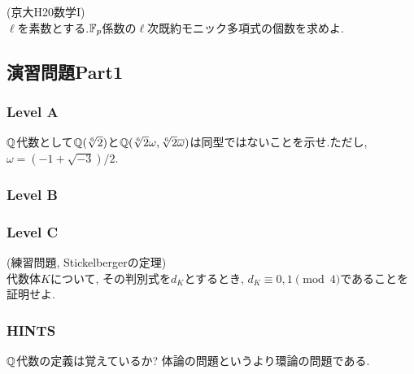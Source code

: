 \begin{egprob} (京大H20数学I)\\
$\ell$を素数とする.$\mathbb{F}_{p}$係数の$\ell$次既約モニック多項式の個数を求めよ.
\end{egprob}




\subsection{演習問題Part1} %
\subsubsection{Level A}
\begin{prob}
$\mathbb{Q}$代数として$\mathbb{Q}(\sqrt[6]{2})$と$\mathbb{Q}(\sqrt[6]{2}\omega , \sqrt[6]{2}\overline{\omega})$は同型ではないことを示せ.ただし, $\omega=(-1+\sqrt{-3})/2$.
\end{prob}

\subsubsection{Level B}

\subsubsection{Level C}
\begin{prob} (\cite{neukirch}練習問題, Stickelbergerの定理)\\
代数体$K$について, その判別式を$d_K$とするとき, $d_K\equiv 0,1\pmod{4}$であることを証明せよ.
\end{prob}


\subsubsection{HINTS}
{\small
\begin{hint}
$\mathbb{Q}$代数の定義は覚えているか? 体論の問題というより環論の問題である.
\end{hint}

}

\newpage
